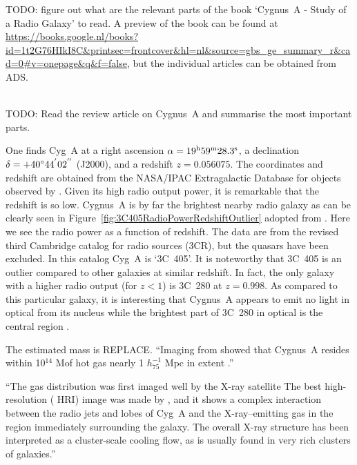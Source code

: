 \documentclass[MScProj_TLRH_ClusterEnergy.tex]{subfiles}
\begin{document}
TODO: figure out what are the relevant parts of the book `Cygnus~A - Study of a Radio Galaxy' \citep{1996cyga.book.....C} to read. A preview of the book can be found at \url{https://books.google.nl/books?id=1t2G76HIkI8C&printsec=frontcover&hl=nl&source=gbs_ge_summary_r&cad=0#v=onepage&q&f=false}, but the individual articles can be obtained from ADS.

\\

TODO: Read the review article on Cygnus~A \citep{1996A&ARv...7....1C} and summarise the most important parts.

One finds Cyg~A at a right ascension $\alpha = 19^{\rm h} 59^{\rm m} 28.3^{\rm s}$, a declination $\delta = +40^\circ 44^{'} 02^{\rm ''}$ (J2000), and a redshift $z = 0.056075$. The coordinates and redshift are obtained from the NASA/IPAC Extragalactic Database for objects observed by \citet{1997ApJ...488L..15O}. Given its high radio output power, it is remarkable that the redshift is so low. Cygnus~A is by far the brightest nearby radio galaxy as can be clearly seen in Figure~\ref{fig:3C405RadioPowerRedshiftOutlier} adopted from \citet{1996cyga.book....1S}. Here we see the radio power as a function of redshift. The data are from the revised third Cambridge catalog for radio sources (3CR), but the quasars have been excluded. In this catalog Cyg~A is `3C~405'. It is noteworthy that 3C~405 is an outlier compared to other galaxies at similar redshift. In fact, the only galaxy with a higher radio output (for $z<1$) is 3C~280 at $z = 0.998$. As compared to this particular galaxy, it is interesting that Cygnus~A appears to emit no light in optical from its nucleus while the brightest part of 3C~280 in optical is the central region \citep{1996cyga.book....1S}.

The estimated mass is REPLACE. ``Imaging from  showed that Cygnus~A resides within 10$^{14}$ M\Sun of hot gas nearly 1 $h_{75}^{-1}$ Mpc in extent \citep{1984MNRAS.211..981A}.''

``The gas distribution was first imaged well by the  X-ray satellite \citep{1984MNRAS.211..981A} The best high-resolution ( HRI) image was made by \citep{1994MNRAS.270..173C}, and it shows a complex interaction between the radio jets and lobes of Cyg~A and the X-ray–emitting gas in the region immediately surrounding the galaxy. The overall X-ray structure has been interpreted as a cluster-scale cooling flow, as is usually found in very rich clusters of galaxies.''
\end{document}
